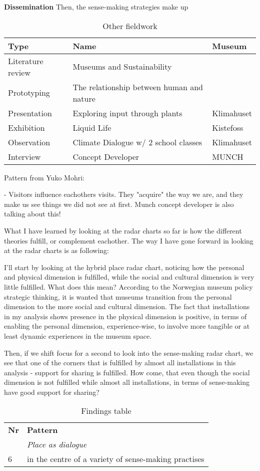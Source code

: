 \textbf{Dissemination}
Then, the sense-making strategies make up



\begin{table}[h]
\centering
\begin{tabular}{l | l| l}
\textbf{Type} & \textbf{Name} & \textbf{Museum}\\
\hline
Literature review & Museums and Sustainability & \\
Prototyping & The relationship between human and nature \\
Presentation & Exploring input through plants & Klimahuset\\
Exhibition & Liquid Life & Kistefoss \\
Observation & Climate Dialogue w/ 2 school classes & Klimahuset\\
Interview & Concept Developer & MUNCH\\
\end{tabular}
\caption{Other fieldwork}
\label{tab:abc}
\end{table}


Pattern from Yuko Mohri:


- Visitors influence eachothers visits. They "acquire" the way we are, and they make us see things we did not see at first. Munch concept developer is also talking about this!


What I have learned by looking at the radar charts so far is how the different theories fulfill, or complement eachother. The way I have gone forward in looking at the radar charts is as following:
\par I'll start by looking at the hybrid place radar chart, noticing how the personal and physical dimension is fulfilled, while the social and cultural dimension is very little fulfilled. What does this mean? According to the Norwegian museum policy strategic thinking, it is wanted that museums transition from the personal dimension to the more social and cultural dimension. The fact that installations in my analysis shows presence in the physical dimension is positive, in terms of enabling the personal dimension, experience-wise, to involve more tangible or at least dynamic experiences in the museum space.
\par Then, if we shift focus for a second to look into the sense-making radar chart, we see that one of the corners that is fulfilled by almost all installations in this analysis - support for sharing is fulfilled. How come, that even though the social dimension is not fulfilled while almost all installations, in terms of sense-making have good support for sharing? 





\begin{table}[h]
\centering
\begin{tabular}{| p{1cm} | p{11cm}| }
\hline
\textbf{Nr} & \textbf{Pattern} \\
& \textit{Place as dialogue }\\
\hline
6 & in the centre of a variety of sense-making practises \\
\hline

\end{tabular}
\caption{Findings table}
\label{tab:abc}
\end{table}

